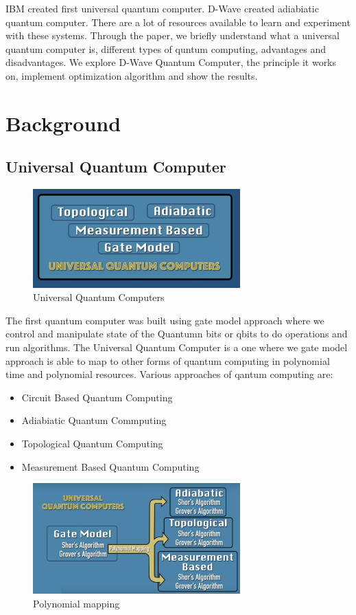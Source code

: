 \documentclass[12pt,conference]{IEEEtran}
\begin{document}
IBM created first universal quantum computer. D-Wave created adiabiatic quantum computer. There are a lot of resources available to learn and experiment with these systems. Through the paper, we briefly understand what a universal quantum computer is, different types of quntum computing, advantages and disadvantages. We explore D-Wave Quantum Computer, the principle it works on, implement optimization algorithm and show the results. 


\section{Background}

\subsection{Universal Quantum Computer}

\begin{figure}[h]
  \centering
  \includegraphics[width=8cm]{uqc.png}
  \caption{Universal Quantum Computers}
  \label{fig:UniversalQC}
\end{figure}

The first quantum computer was built using gate model approach where we control and manipulate state of the Quantumn bits or qbits to do operations and run algorithms. The Universal Quantum Computer is a one where we gate model approach is able to map to other forms of quantum computing in polynomial time and polynomial resources. Various approaches of qantum computing are:
\begin{itemize}
  \item Circuit Based Quantum Computing
  \item Adiabiatic Quantum Commputing
  \item Topological Quantum Computing
  \item Measurement Based Quantum Computing
\end{itemize}

\begin{figure}[h]
  \centering
  \includegraphics[width=8cm]{uqc_mapping.jpg}
  \caption{Polynomial mapping}
  \label{fig:PolynomicalUQC}
\end{figure}
\end{document}
